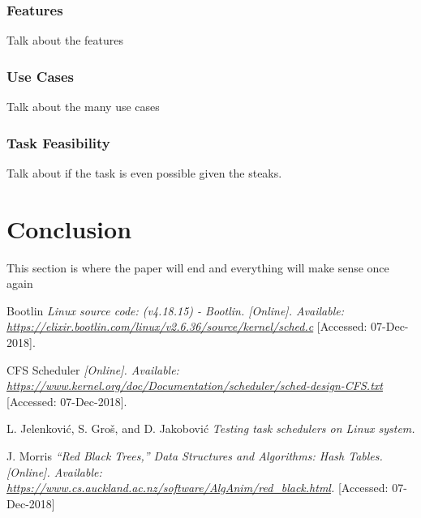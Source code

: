 \documentclass[conference,12pt, ]{IEEEtran}
\begin{document}
\subsubsection{Features}
Talk about the features
\subsubsection{Use Cases}
Talk about the many use cases
\subsubsection{Task Feasibility}
Talk about if the task is even possible given the steaks.



\section{Conclusion}
This section is where the paper will end and everything will make sense once again

  \begin{thebibliography}{999}

   Bootlin {\em Linux source code: (v4.18.15) - Bootlin. [Online]. Available: \url{https://elixir.bootlin.com/linux/v2.6.36/source/kernel/sched.c}} [Accessed: 07-Dec-2018].

    CFS Scheduler {\em [Online]. Available: \url{https://www.kernel.org/doc/Documentation/scheduler/sched-design-CFS.txt}} [Accessed: 07-Dec-2018].

   L. Jelenković, S. Groš, and D. Jakobović {\em Testing task schedulers on Linux system.} 

   J. Morris {\em “Red Black Trees,” Data Structures and Algorithms: Hash Tables. [Online]. Available: \url{https://www.cs.auckland.ac.nz/software/AlgAnim/red_black.html}.} [Accessed: 07-Dec-2018]

  \end{thebibliography}
\end{document}
